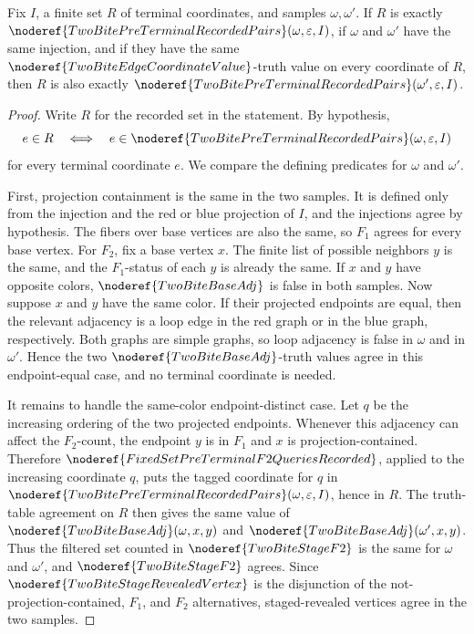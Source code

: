 \begin{helper}
Fix \(I\), a finite set \(R\) of terminal coordinates, and samples
\(\omega,\omega'\).  If \(R\) is exactly
\(\noderef{TwoBitePreTerminalRecordedPairs}(\omega,\varepsilon,I)\), if
\(\omega\) and \(\omega'\) have the same injection, and if they have the same
\(\noderef{TwoBiteEdgeCoordinateValue}\)-truth value on every coordinate of
\(R\), then \(R\) is also exactly
\(\noderef{TwoBitePreTerminalRecordedPairs}(\omega',\varepsilon,I)\).
\end{helper}
\begin{proof}
Write \(R\) for the recorded set in the statement.  By hypothesis,
\[
e\in R \quad\Longleftrightarrow\quad
e\in\noderef{TwoBitePreTerminalRecordedPairs}(\omega,\varepsilon,I)
\]
for every terminal coordinate \(e\).  We compare the defining predicates for
\(\omega\) and \(\omega'\).

First, projection containment is the same in the two samples.  It is defined
only from the injection and the red or blue projection of \(I\), and the
injections agree by hypothesis.  The fibers over base vertices are also the
same, so \(F_1\) agrees for every base vertex.  For \(F_2\), fix a base vertex
\(x\).  The finite list of possible neighbors \(y\) is the same, and the
\(F_1\)-status of each \(y\) is already the same.  If \(x\) and \(y\) have
opposite colors, \(\noderef{TwoBiteBaseAdj}\) is false in both samples.  Now
suppose \(x\) and \(y\) have the same color.  If their projected endpoints are
equal, then the relevant adjacency is a loop edge in the red graph or in the
blue graph, respectively.  Both graphs are simple graphs, so loop adjacency is
false in \(\omega\) and in \(\omega'\).  Hence the two
\(\noderef{TwoBiteBaseAdj}\)-truth values agree in this endpoint-equal case,
and no terminal coordinate is needed.

It remains to handle the same-color endpoint-distinct case.  Let \(q\) be the
increasing ordering of the two projected endpoints.  Whenever this adjacency
can affect the \(F_2\)-count, the endpoint \(y\) is in \(F_1\) and \(x\) is
projection-contained.  Therefore
\(\noderef{FixedSetPreTerminalF2QueriesRecorded}\), applied to the increasing
coordinate \(q\), puts the tagged coordinate for \(q\) in
\(\noderef{TwoBitePreTerminalRecordedPairs}(\omega,\varepsilon,I)\), hence in
\(R\).  The truth-table agreement on \(R\) then gives the same value of
\(\noderef{TwoBiteBaseAdj}(\omega,x,y)\) and
\(\noderef{TwoBiteBaseAdj}(\omega',x,y)\).  Thus the filtered set counted in
\(\noderef{TwoBiteStageF2}\) is the same for \(\omega\) and \(\omega'\), and
\(\noderef{TwoBiteStageF2}\) agrees.  Since
\(\noderef{TwoBiteStageRevealedVertex}\) is the disjunction of the
not-projection-contained, \(F_1\), and \(F_2\) alternatives, staged-revealed
vertices agree in the two samples.


\end{proof}
